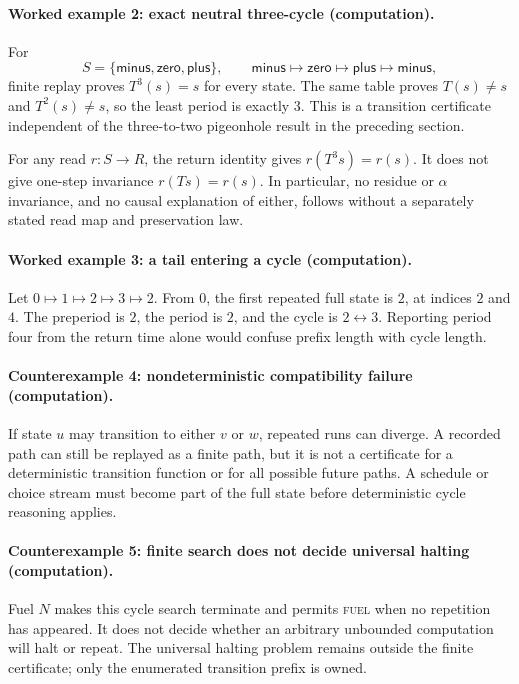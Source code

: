\paragraph{Worked example 2: exact neutral three-cycle (computation).}
For
\[
S=\{\mathsf{minus},\mathsf{zero},\mathsf{plus}\},
\qquad
\mathsf{minus}\mapsto\mathsf{zero}\mapsto\mathsf{plus}\mapsto\mathsf{minus},
\]
finite replay proves \(T^3(s)=s\) for every state.  The same table proves \(T(s)\ne s\) and \(T^2(s)\ne s\), so the
least period is exactly \(3\).  This is a transition certificate independent of the three-to-two pigeonhole result in
the preceding section.

For any read \(r:S\to R\), the return identity gives \(r(T^3s)=r(s)\).  It does not give one-step invariance
\(r(Ts)=r(s)\).  In particular, no residue or \(\alpha\) invariance, and no causal explanation of either, follows
without a separately stated read map and preservation law.

\paragraph{Worked example 3: a tail entering a cycle (computation).}
Let \(0\mapsto1\mapsto2\mapsto3\mapsto2\).  From \(0\), the first repeated full state is \(2\), at indices \(2\) and
\(4\).  The preperiod is \(2\), the period is \(2\), and the cycle is \(2\leftrightarrow3\).  Reporting period four
from the return time alone would confuse prefix length with cycle length.

\paragraph{Counterexample 4: nondeterministic compatibility failure (computation).}
If state \(u\) may transition to either \(v\) or \(w\), repeated runs can diverge.  A recorded path can still be
replayed as a finite path, but it is not a certificate for a deterministic transition function or for all possible
future paths.  A schedule or choice stream must become part of the full state before deterministic cycle reasoning
applies.

\paragraph{Counterexample 5: finite search does not decide universal halting (computation).}
Fuel \(N\) makes this cycle search terminate and permits \textsc{fuel} when no repetition has appeared.  It does not
decide whether an arbitrary unbounded computation will halt or repeat.  The universal halting problem remains outside
the finite certificate; only the enumerated transition prefix is owned.

